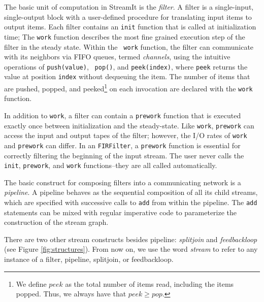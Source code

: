The basic unit of computation in StreamIt is the {\it filter}.  A
filter is a single-input, single-output block with a user-defined
procedure for translating input items to output items.  
Each filter contains an {\tt init}
function that is called at initialization time; 
The {\tt work} function describes the most fine grained
execution step of the filter in the steady state.  Within the {\tt
work} function, the filter can communicate with its neighbors via FIFO
queues, termed {\it channels}, using the intuitive operations of {\tt push(value)}, {\tt
pop()}, and {\tt peek(index)}, where {\tt peek} returns the value at
position {\tt index} without dequeuing the item.  The number of items
that are pushed, popped, and peeked\footnote{We define $peek$ as the
total number of items read, including the items popped.  Thus, we
always have that $peek \ge pop$.} on each invocation are declared with
the {\tt work} function.

In addition to {\tt work}, a filter can contain a {\tt prework}
function that is executed exactly once between initialization and the
steady-state.  Like {\tt work}, {\tt prework} can access the input and
output tapes of the filter; however, the I/O rates of {\tt work} and
{\tt prework} can differ.  In an {\tt FIRFilter}, a {\tt prework}
function is essential for correctly filtering the beginning of the
input stream.  The user never calls the {\tt init}, {\tt prework}, and
{\tt work} functions--they are all called automatically.

The basic construct for composing filters into a communicating network
is a {\it pipeline}.%
A pipeline behaves as the sequential composition
of all its child streams, which are specified with successive calls to
{\tt add} from within the pipeline.  
The {\tt add} statements can be mixed with regular imperative code to
parameterize the construction of the stream graph.

There are two other stream constructs besides pipeline: {\it
splitjoin} and {\it feedbackloop} (see Figure \ref{fig:structures}).
From now on, we use the word {\it stream} to refer to any instance of
a filter, pipeline, splitjoin, or feedbackloop.

